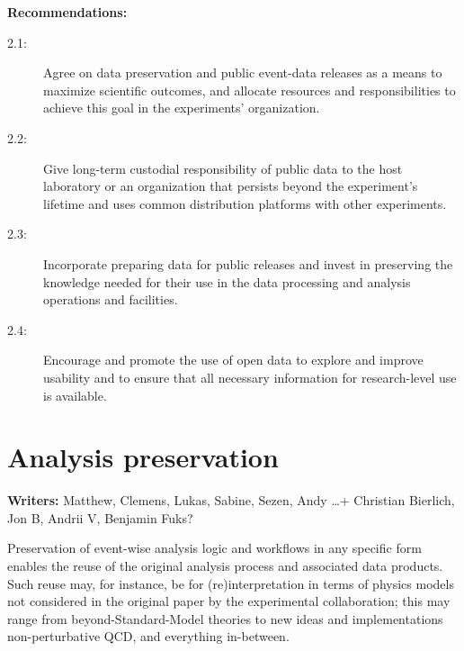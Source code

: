 \documentclass[11pt]{article}
\begin{document}
\noindent
\textbf{Recommendations:}
\begin{description}
   \item[2.1:] Agree on data preservation and public event-data releases as a means to maximize scientific outcomes, and allocate resources and responsibilities to achieve this goal in the experiments' organization. %
   \item[2.2:] Give long-term custodial responsibility of public data to the host laboratory or an organization that persists beyond the experiment's lifetime and uses common distribution platforms with other experiments.
   \item[2.3:] Incorporate preparing data for public releases and invest in preserving the knowledge needed for their use in the data processing and analysis operations and facilities.
   \item[2.4:] Encourage and promote the use of open data to explore and improve usability and to ensure that all necessary information for research-level use is available.
\end{description}



\section{Analysis preservation}
\label{analysis-preservation}

\noindent\textbf{Writers:} Matthew, Clemens, Lukas, Sabine, Sezen, Andy \dots + Christian Bierlich, Jon B, Andrii V, Benjamin Fuks?


Preservation of event-wise analysis logic and workflows in any specific form enables the reuse of the original analysis process and associated data products. Such reuse may, for instance, be for (re)interpretation in terms of physics models not considered in the original paper by the experimental collaboration; this may range from beyond-Standard-Model theories to new ideas and implementations non-perturbative QCD, and everything in-between.
\end{document}

